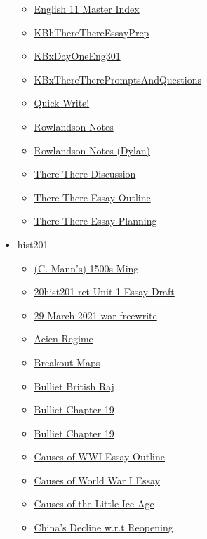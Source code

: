 \documentclass[11pt]{article}
\begin{document}
\begin{itemize}
\begin{itemize}
\item \href{eng301/KBMasterIndexEng301.org}{English 11 Master Index}
\item \href{eng301/KBhThereThereEssayPrep.org}{KBhThereThereEssayPrep}
\item \href{eng301/KBxDayOneEng301.org}{KBxDayOneEng301}
\item \href{eng301/KBxThereTherePromptsAndQuestions.org}{KBxThereTherePromptsAndQuestions}
\item \href{eng301/KBxQuickWrite.org}{Quick Write!}
\item \href{eng301/KBxRowlandson.org}{Rowlandson Notes}
\item \href{eng301/KBdRowlandson.org}{Rowlandson Notes (Dylan)}
\item \href{eng301/KBhENG301ThereThereDiscussion.org}{There There Discussion}
\item \href{eng301/KBdThereThereEssayOutline.org}{There There Essay Outline}
\item \href{eng301/KBxThereThereEssayPlanning.org}{There There Essay Planning}
\end{itemize}
\item hist201
\begin{itemize}
\item \href{hist201/KBhHIST201MannMing.org}{(C. Mann's) 1500s Ming}
\item \href{hist201/KBe20hist201retUnit1EssayDraft.org}{20hist201 ret Unit 1 Essay Draft}
\item \href{hist201/KBe21hist201retFreewriteWar.org}{29 March 2021 war freewrite}
\item \href{hist201/KBhHIST201AcienRegime.org}{Acien Regime}
\item \href{hist201/KB20200826093400.org}{Breakout Maps}
\item \href{hist201/KBhHIST201BritishRaj.org}{Bulliet British Raj}
\item \href{hist201/KBBullietCh19.org}{Bulliet Chapter 19}
\item \href{hist201/KBhHIST201BullietCh19.org}{Bulliet Chapter 19}
\item \href{hist201/KBe21hist201floCausesOfWWIEssayOutline.org}{Causes of WWI Essay Outline}
\item \href{hist201/KBe21hist201retCausesOfWWIEssay.org}{Causes of World War I Essay}
\item \href{hist201/KBhHIST201TheoriesOfLittleIceAge.org}{Causes of the Little Ice Age}
\item \href{hist201/KBhHIST201ChinasDeclineWRTReopening.org}{China's Decline w.r.t Reopening}

\end{itemize}
\end{itemize}
\end{document}
